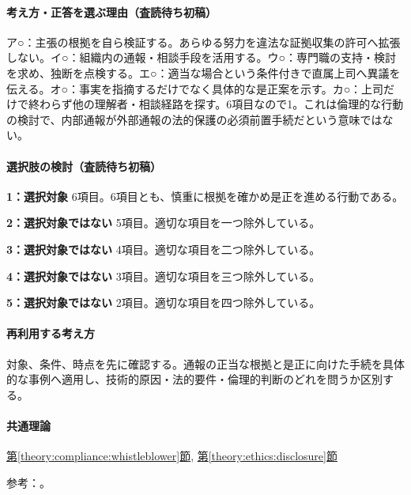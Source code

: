 \paragraph{考え方・正答を選ぶ理由（査読待ち初稿）} ア○：主張の根拠を自ら検証する。あらゆる努力を違法な証拠収集の許可へ拡張しない。イ○：組織内の通報・相談手段を活用する。ウ○：専門職の支持・検討を求め、独断を点検する。エ○：適当な場合という条件付きで直属上司へ異議を伝える。オ○：事実を指摘するだけでなく具体的な是正案を示す。カ○：上司だけで終わらず他の理解者・相談経路を探す。6項目なので1。これは倫理的な行動の検討で、内部通報が外部通報の法的保護の必須前置手続だという意味ではない。

\paragraph{選択肢の検討（査読待ち初稿）}\mbox{}\par

\noindent\textbf{1：選択対象} 6項目。6項目とも、慎重に根拠を確かめ是正を進める行動である。\par

\noindent\textbf{2：選択対象ではない} 5項目。適切な項目を一つ除外している。\par

\noindent\textbf{3：選択対象ではない} 4項目。適切な項目を二つ除外している。\par

\noindent\textbf{4：選択対象ではない} 3項目。適切な項目を三つ除外している。\par

\noindent\textbf{5：選択対象ではない} 2項目。適切な項目を四つ除外している。\par

\paragraph{再利用する考え方} 対象、条件、時点を先に確認する。通報の正当な根拠と是正に向けた手続を具体的な事例へ適用し、技術的原因・法的要件・倫理的判断のどれを問うか区別する。

\paragraph{共通理論} \hyperref[theory:compliance:whistleblower]{第\ref*{theory:compliance:whistleblower}節}, \hyperref[theory:ethics:disclosure]{第\ref*{theory:ethics:disclosure}節}

\par 参考：\cite{ipej_ethics2011,caa_handbook_pre2022,caa_current_faq}。

